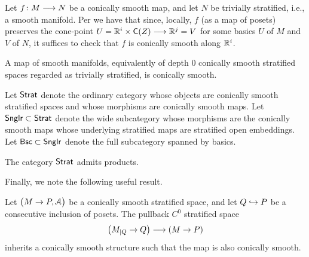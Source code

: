 \begin{observation}
    Let $f \colon M \longrightarrow N$ be a conically smooth map, and let $N$ be trivially stratified, i.e., a smooth manifold. Per  we have that since, locally, $f$ (as a map of posets) preserves the cone-point $ U = \mathbb R^{i} \times \mathsf C(Z) \longrightarrow \mathbb R^{j} = V$ for some basics $U$ of $M$ and $V$ of $N$, it suffices to check that $f$ is conically smooth along $\mathbb R^{i}$.
\end{observation}

\begin{observation}
    A map of smooth manifolds, equivalently of depth $0$ conically smooth stratified spaces regarded as trivially stratified, is conically smooth. 
\end{observation}

\begin{definition}
    Let $\operatorname{\mathsf{Strat}}$ denote the ordinary category whose objects are conically smooth stratified spaces and whose morphisms are conically smooth maps. Let $\operatorname{\sf Snglr} \subset \operatorname{\mathsf{Strat}}$ denote the wide subcategory whose morphisms are the conically smooth maps whose underlying stratified maps are stratified open embeddings. Let $\operatorname{\mathsf{Bsc}} \subset \operatorname{\sf Snglr}$ denote the full subcategory spanned by basics.
\end{definition}

\begin{proposition}\cite[Corollary~3.4.10]{AFT1}
    The category $\operatorname{\mathsf{Strat}}$ admits products.
\end{proposition}

Finally, we note the following useful result.

\begin{lemma}\cite[Lemma 3.4.5]{AFT1}
    Let $\big(M \rightarrow P, \mathcal{A}\big)$ be a conically smooth stratified space, and let $Q \hookrightarrow P$ be a consecutive inclusion of posets. The pullback $C^0$ stratified space 
    \begin{equation}
        \label{eq 2}
        \big(M_{|Q} \rightarrow Q\big) \longrightarrow (M \rightarrow P)
    \end{equation}
    inherits a conically smooth structure such that the map  is also conically smooth.
\end{lemma}

